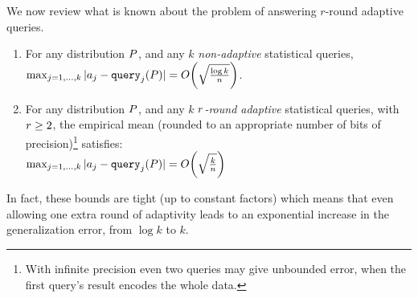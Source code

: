 We now review what is known about the problem of answering $r$-round adaptive queries.  
\begin{thm} 
\label{thm:nonadapt-adapt}
\begin{enumerate}

\item For any distribution $P$, and any $k$ \emph{non-adaptive} statistical queries, 
$
\max_{j=1,\dots,k} | \answer_j - \query_j(\dist) | = O\left( \sqrt{\frac{\log k}{n}}  \right)
$.
%
\item For any distribution $P$, and  any $k$  \emph{$r$-round adaptive} statistical queries, with $r \geq 2$, the empirical mean (rounded to an appropriate number of bits of precision)\footnote{With infinite precision even two queries may give unbounded error, when the first query's result encodes the whole data.} satisfies:\\
$
\max_{j=1,\dots,k} | \answer_j - \query_j(\dist) | = O\left( \sqrt{\frac{k}{n}}  \right)
$
\end{enumerate}
\end{thm}
In fact, these bounds are tight (up to constant factors) which means that even allowing one extra round of adaptivity leads to an exponential increase in the generalization error, from $\log k$ to $k$.


